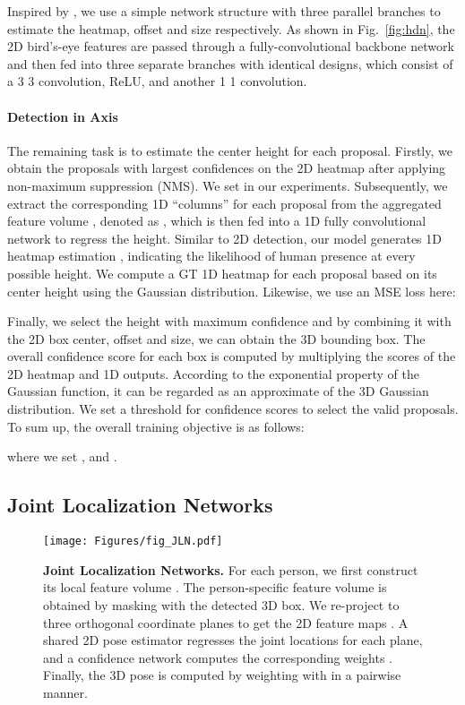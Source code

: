 Inspired by \cite{zhou2019objects}, we use a simple network structure with three parallel branches to estimate the heatmap, offset and size respectively. As shown in Fig.~\ref{fig:hdn}, the 2D bird's-eye features are passed through a fully-convolutional backbone network and then fed into three separate branches with identical designs, which consist of a 3  3 convolution, ReLU, and another 1  1 convolution. 

\paragraph{Detection in  Axis}
The remaining task is to estimate the center height for each proposal. Firstly, we obtain the proposals with  largest confidences on the 2D heatmap  after applying non-maximum suppression (NMS). We set  in our experiments. Subsequently, we extract the corresponding 1D ``columns'' for each proposal from the aggregated feature volume , denoted as , which is then fed into a 1D fully convolutional network to regress the height. Similar to 2D detection, our model generates 1D heatmap estimation , indicating the likelihood of human presence at every possible height. We compute a GT 1D heatmap   for each proposal based on its center height using the Gaussian distribution. Likewise, we use an MSE loss here:


Finally, we select the height with maximum confidence and by combining it with the 2D box center, offset and size, we can obtain the 3D bounding box. The overall confidence score for each box is computed by multiplying the scores of the 2D heatmap and 1D outputs. According to the exponential property of the Gaussian function, it can be regarded as an approximate of the 3D Gaussian distribution. We set a threshold for confidence scores to select the valid proposals. To sum up, the overall training objective is as follows:

where we set ,  and .

\subsection{Joint Localization Networks}
\label{sec:JLN}
\begin{figure*}[t]
  \centering
  \texttt{[image: Figures/fig\_JLN.pdf]}
  \caption{\textbf{Joint Localization Networks.} For each person, we first construct its local feature volume . The person-specific feature volume  is obtained by masking  with the detected 3D box. We re-project  to three orthogonal coordinate planes to get the 2D feature maps . A shared 2D pose estimator regresses the joint locations  for each plane, and a confidence network computes the corresponding weights . Finally, the 3D pose  is computed by weighting  with  in a pairwise manner. } 
  \label{fig:jln}
\end{figure*}

